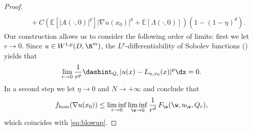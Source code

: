 \begin{proof}
\begin{align*}
\\
&\quad+C\left(\mathbb{E}[|A(\cdot,0)|^p]|\nabla u(x_0)|^p+\mathbb{E}[\Lambda(\cdot,0)]\right)(1-(1-\eta)^d).
\end{align*}
Our construction allows us to consider the following order of limits: first we let $r\to 0$. Since $u\in W^{1,p}(D,\R^m)$, the $L^p$-differentiability of Sobolev functions (\cf \cite[Th.\,2, p.\,230]{EvGa}) yields that
\begin{equation*}
\lim_{r\to 0}\frac{1}{r^p}\dashint_{Q_r}|u(x)-L_{u,x_0}(x)|^p\dx=0.
\end{equation*}
In a second step we let $\eta\to 0$ and $N\to +\infty$ and conclude that
\begin{equation*}
f_{\hom}(\nabla u(x_0))\leq \liminf_{r\to 0}\liminf_{\e\to 0}\frac{1}{r^d}\,F_{\e}(\w,u_{\e},Q_r),
\end{equation*}
which coincides with \eqref{eq:blowup}.


\end{proof}
